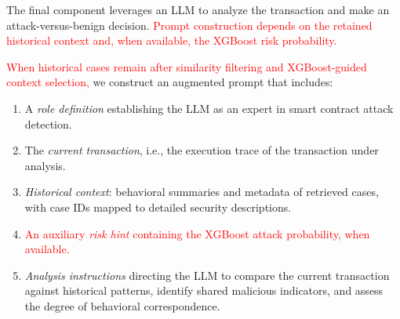 \label{sec:reasoning}

The final component leverages an LLM to analyze the transaction and make an attack-versus-benign decision. \textcolor{red}{Prompt construction depends on the retained historical context and, when available, the XGBoost risk probability.}


\textcolor{red}{When historical cases remain after similarity filtering and XGBoost-guided context selection,} we construct an augmented prompt that includes:

\begin{enumerate}
    \item A \textit{role definition} establishing the LLM as an expert in smart contract attack detection.
    \item The \textit{current transaction}, i.e., the execution trace of the transaction under analysis.
    \item \textit{Historical context}: behavioral summaries and metadata of retrieved cases, with case IDs mapped to detailed security descriptions.
    \item \textcolor{red}{An auxiliary \textit{risk hint} containing the XGBoost attack probability, when available.}
    \item \textit{Analysis instructions} directing the LLM to compare the current transaction against historical patterns, identify shared malicious indicators, and assess the degree of behavioral correspondence.
\end{enumerate}

